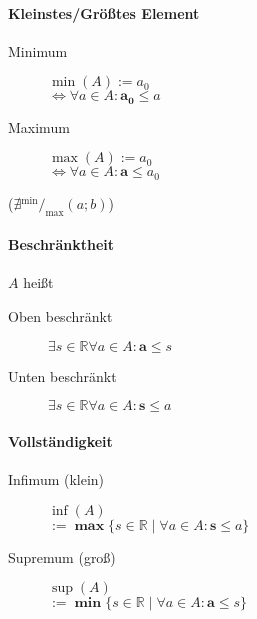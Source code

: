 \paragraph{Kleinstes/Grö\ss tes Element}

\begin{mzImportant}
  \begin{description}
    \item [Minimum]
          $\min(A) := a_0$ \\
          $\Leftrightarrow \forall a \in A: \mathbf{a_0} \boldsymbol{\leq} a$

    \item [Maximum]
          $\max(A) := a_0$ \\
          $\Leftrightarrow \forall a \in A: \mathbf{a} \boldsymbol{\leq} a_0$
  \end{description}
\end{mzImportant}

($\nexists {}^{\min}/_{\max} (a;b)$)

\paragraph{Beschränktheit} $A$ hei\ss t

\begin{description}
  \item [Oben beschränkt]
        $\exists s \in \mathbb{R} \forall a \in A: \mathbf{a} \boldsymbol{\leq} s$

  \item [Unten beschränkt]
        $\exists s \in \mathbb{R} \forall a \in A: \mathbf{s} \boldsymbol{\leq} a$
\end{description}

\paragraph{Vollständigkeit}

\begin{mzImportant}
  \begin{description}
    \item [Infimum (klein)] $\inf(A)$ \\
          $:= \mathbf{\max} \{ s \in \mathbb{R} \mid \forall a \in A: \mathbf{s} \boldsymbol{\leq} a \}$

    \item [Supremum (gro\ss)] $\sup(A)$ \\
          $:= \mathbf{\min} \{ s \in \mathbb{R} \mid \forall a \in A: \mathbf{a} \boldsymbol{\leq} s \}$
  \end{description}
\end{mzImportant}

